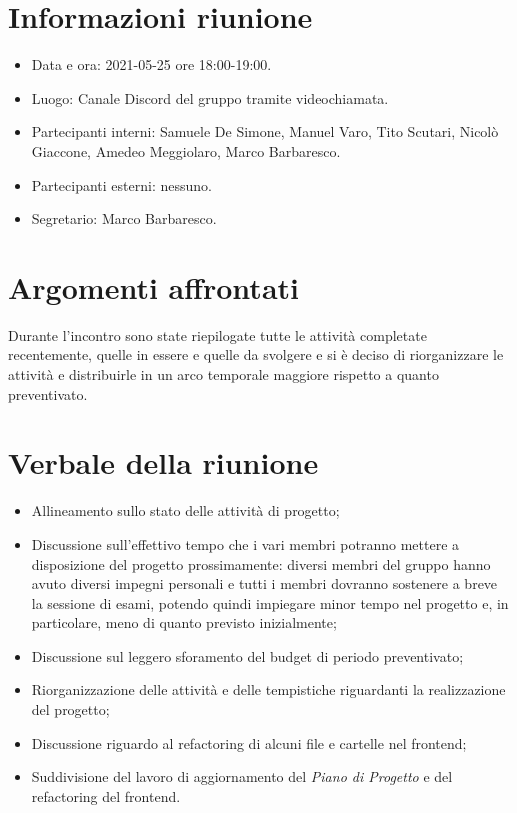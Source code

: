 \documentclass[a4paper]{article}
\begin{document}
\newpage
\tableofcontents
\newpage

\section{Informazioni riunione}
\begin{itemize}
    \item Data e ora: 2021-05-25 ore 18:00-19:00.
    \item Luogo: Canale Discord del gruppo tramite videochiamata.
    \item Partecipanti interni: Samuele De Simone, Manuel Varo, Tito Scutari, Nicolò Giaccone, Amedeo Meggiolaro, Marco Barbaresco.
    \item Partecipanti esterni: nessuno.
    \item Segretario: Marco Barbaresco.
\end{itemize}
\section{Argomenti affrontati}
Durante l'incontro sono state riepilogate tutte le attività completate recentemente, quelle in essere e quelle da svolgere e si è deciso
di riorganizzare le attività e distribuirle in un arco temporale maggiore rispetto a quanto preventivato.
\section{Verbale della riunione}
\begin{itemize}
    \item Allineamento sullo stato delle attività di progetto;
    \item Discussione sull'effettivo tempo che i vari membri potranno mettere a disposizione del progetto prossimamente: diversi membri del gruppo hanno
          avuto diversi impegni personali e tutti i membri dovranno sostenere a breve la sessione di esami, potendo quindi impiegare minor tempo nel progetto e, in particolare,
          meno di quanto previsto inizialmente;
    \item Discussione sul leggero sforamento del budget di periodo preventivato;
    \item Riorganizzazione delle attività e delle tempistiche riguardanti la realizzazione del progetto;
    \item Discussione riguardo al refactoring di alcuni file e cartelle nel frontend;
    \item Suddivisione del lavoro di aggiornamento del \textit{Piano di Progetto} e del refactoring del frontend.
\end{itemize}
\newpage
\end{document}
